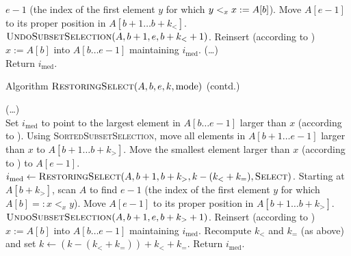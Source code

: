 \begin{algorithm}
\begin{algorithmic}[1]
          $e-1$ (the index of the first element $y$ for which 
          $y\LB x:=A[b]$). 
          \STATE Move ${A}[e-1]$ to its proper position in
          ${A}[b+1\ldots b+k_<]$.
          \STATE $\textsc{UndoSubsetSelection}({A},b+1,e,b+k_<+1)$.
          \STATE Reinsert (according to \LA) $x:={A}[b]$ into
          ${A}[b\ldots e-1]$ maintaining $i_{\mathrm{med}}$.
        \ENDIF
          \setcounter{ALGBREAK}{\value{ALC@line}}
       \ELSE
         \STATE (\ldots) \\[2ex]
         \setcounter{ALC@line}{44}
       \ENDIF
     \ENDIF
     \STATE Return $i_{\mathrm{med}}$.
 \end{algorithmic}
\end{algorithm}

\begin{algorithm}
  \addtocounter{algorithm}{-1}
  \caption{Algorithm
    $\textsc{RestoringSelect}({A},b,e,k,\text{mode})$ (contd.)}
  \begin{algorithmic}[1]
    \setcounter{ALC@line}{17}
        \STATE (\ldots)\\[2ex]
        \setcounter{ALC@line}{\value{ALGBREAK}}
      \ELSE
          \STATE Set $i_{\mathrm{med}}$ to point to the largest element
          in ${A}[b\ldots e-1]$ larger than $x$ (according to \LB).
        \ELSE
          \STATE Using \textsc{SortedSubsetSelection}, move all elements in
          ${A}[b+1\ldots e-1]$ larger than $x$ to
          ${A}[b+1\ldots b+k_>]$.
          \STATE Move the smallest element larger than $x$ (according to
          \LB) to ${A}[e-1]$.
          \STATE
          $i_{\mathrm{med}} \leftarrow 
           \textsc{RestoringSelect}({A},b+1,b+k_>,k-(k_<+k_=),\textsc{Select})$.
          \setcounter{SelectC}{\value{ALC@line}}
          \STATE Starting at ${A}[b+k_>]$, scan ${A}$ to find
          $e-1$ (the index of the first element $y$ for which 
          ${A}[b] =: x <_{x} y$). 
          \STATE Move ${A}[e-1]$ to its proper position in
          ${A}[b+1\ldots b+k_>]$.
          \STATE $\textsc{UndoSubsetSelection}({A},b+1,e,b+k_>+1)$.
          \STATE Reinsert (according to \LA) $x:=A[b]$ into
          ${A}[b\ldots e-1]$ maintaining $i_{\mathrm{med}}$.
          \STATE Recompute $k_<$ and $k_=$ (as above) and set 
            $k \leftarrow (k-(k_<+k_=))+k_<+k_=$. 
        \ENDIF
       \ENDIF
    \ENDIF
    \STATE Return $i_{\mathrm{med}}$.
  \end{algorithmic}
\end{algorithm}

